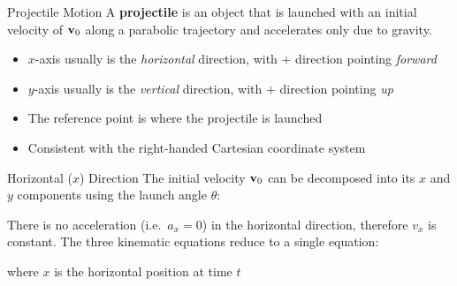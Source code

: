 \documentclass[12pt,compress,aspectratio=169]{beamer}
\newcommand{\iii}{\ensuremath\hat{\bm{\imath}}}
\newcommand{\jjj}{\ensuremath\hat{\bm{\jmath}}}
\newcommand{\mb}[1]{\ensuremath\mathbf{#1}}
\newcommand{\eq}[2]{\vspace{#1}{\Large\begin{displaymath}#2\end{displaymath}}}
\begin{document}
\begin{frame}{Projectile Motion}
  A \textbf{projectile} is an object that is launched with an initial velocity
  of $\mb{v}_0$ along a parabolic trajectory and accelerates only due to
  gravity.
  \begin{center}
  \end{center}
  \begin{itemize}
  \item $x$-axis usually is the \emph{horizontal} direction, with $+$ direction
    pointing \emph{forward}
  \item $y$-axis usually is the \emph{vertical} direction, with $+$ direction
    pointing \emph{up}
  \item The reference point is where the projectile is launched
  \item Consistent with the right-handed Cartesian coordinate system
  \end{itemize}
\end{frame}



\begin{frame}{Horizontal ($x$) Direction}
  The initial velocity $\mb{v}_0$ can be decomposed into its $x$ and $y$
  components using the launch angle $\theta$:

  \eq{-.2in}{
    \mb{v}_0=v_x\iii + v_{y0}\jjj =
    \left[v_0\cos\theta\right]\iii + \left[v_0\sin\theta\right]\jjj
  }

  There is no acceleration (i.e.\ $a_x=0$) in the horizontal direction,
  therefore $v_x$ is constant. The three kinematic equations reduce to a single
  equation:

  \eq{-.2in}{
    x=v_xt=\left[v_0\cos\theta\right] t
  }

  where $x$ is the horizontal position at time $t$ %
\end{frame}
\end{document}

